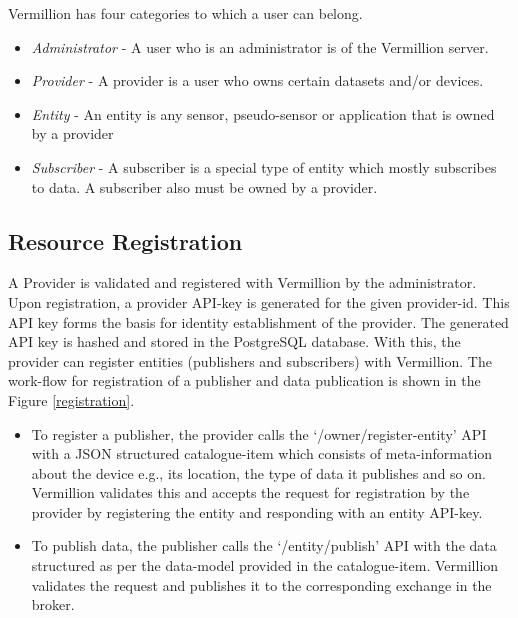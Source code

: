 \documentclass[conference, 10pt]{IEEEtran}
\begin{document}
Vermillion has four categories to which a user can belong. 

\begin{itemize}
\item \textit{Administrator} - A user who is an administrator is of the Vermillion server.
\item \textit{Provider} - A provider is a user who owns certain datasets and/or devices.
\item \textit{Entity} - An entity is any sensor, pseudo-sensor or application that is owned by a provider
\item \textit{Subscriber} - A subscriber is a special type of entity which mostly subscribes to data. A subscriber also must be owned by a provider.
\end{itemize}

\subsection{Resource Registration}

A Provider is validated and registered with Vermillion by the administrator. Upon registration, a provider API-key is generated for the given provider-id. This API key forms the basis for identity establishment of the provider. The generated API key is hashed and stored in the PostgreSQL database. With this, the provider can register entities (publishers and subscribers) with Vermillion. The work-flow for registration of a publisher and data publication is shown in the Figure \ref{registration}. 

\begin{itemize}
\item To register a publisher, the provider calls the ‘/owner/register-entity’ API with a JSON structured catalogue-item which consists of meta-information about the device e.g., its location, the type of data it publishes and so on. Vermillion validates this and accepts the request for registration by the provider by registering the entity and responding with an entity API-key.

\item To publish data, the publisher calls the ‘/entity/publish’ API with the data structured as per the data-model provided in the catalogue-item. Vermillion validates the request and publishes it to the corresponding exchange in the broker.
\end{itemize}
\end{document}
